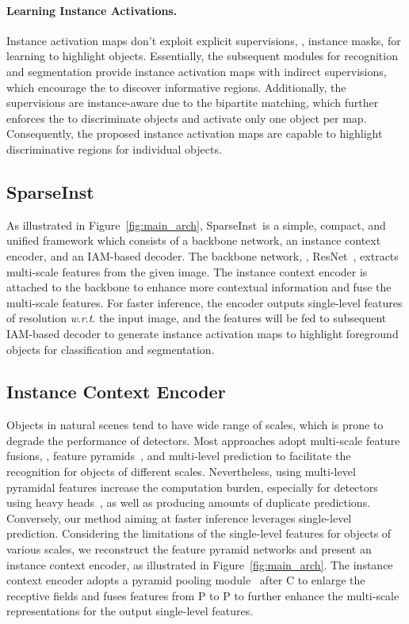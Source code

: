 \documentclass[10pt,twocolumn,letterpaper]{article}
\newcommand{\name}{SparseInst}
\renewcommand{\wrt}{\textit{w}.\textit{r}.\textit{t}. }
\begin{document}
\paragraph{Learning Instance Activations.}
\label{learn_iam}
Instance activation maps don't exploit explicit supervisions, \eg, instance masks, for learning to highlight objects.
Essentially, the subsequent modules for recognition and segmentation provide instance activation maps with indirect supervisions, which encourage the  to discover informative regions.
Additionally, the supervisions are instance-aware due to the bipartite matching, which further enforces the  to discriminate objects and activate only one object per map.
Consequently, the proposed instance activation maps are capable to highlight discriminative regions for individual objects.




\subsection{\name}
As illustrated in Figure~\ref{fig:main_arch}, \name~is a simple, compact, and unified framework which consists of a backbone network, an instance context encoder, and an IAM-based decoder. The backbone network, \eg, ResNet~\cite{HeZRS16}, extracts multi-scale features from the given image. The instance context encoder is attached to the backbone to enhance more contextual information and fuse the multi-scale features.
For faster inference, the encoder outputs single-level features of  resolution \wrt the input image, and the features will be fed to subsequent IAM-based decoder to generate instance activation maps to highlight foreground objects for classification and segmentation. 

\subsection{Instance Context Encoder}
Objects in natural scenes tend to have wide range of scales, which is prone to degrade the performance of detectors.
Most approaches adopt multi-scale feature fusions, \eg, feature pyramids~\cite{LinDGHHB17}, and multi-level prediction to facilitate the recognition for objects of different scales.
Nevertheless, using multi-level pyramidal features increase the computation burden, especially for detectors using heavy heads~\cite{FocalLinGGHD17,FCOSTianSCH19}, as well as producing amounts of duplicate predictions.
Conversely, our method aiming at faster inference leverages single-level prediction.
Considering the limitations of the single-level features for objects of various scales, we reconstruct the feature pyramid networks and present an instance context encoder, as illustrated in Figure~\ref{fig:main_arch}.
The instance context encoder adopts a pyramid pooling module~\cite{ZhaoSQWJ17} after C to enlarge the receptive fields and fuses features from P to P to further enhance the multi-scale representations for the output single-level features.
\end{document}
